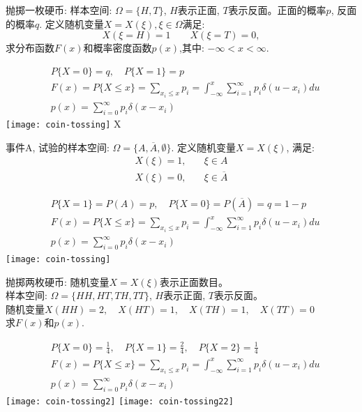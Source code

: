 \begin{frame}[shrink]
\begin{example}
抛掷一枚硬币: 样本空间: $\Omega=\{H,T\}$, $H$表示正面, $T$表示反面。正面的概率$p$, 反面的概率$q$. 定义随机变量$X=X(\xi),\xi\in \Omega$满足:
	\[X(\xi=H)=1\qquad X(\xi=T)=0,\]
	求分布函数$F(x)$和概率密度函数$p(x)$,其中: $-\infty<x<\infty$.
\end{example}
\begin{align*}
&P\{X=0\}=q,\quad P\{X=1\}=p\\
&F(x)=P\{X\le x\}=\sum\limits_{x_i\le x}p_i=\int_{-\infty}^{x}\sum\limits_{i=1}^{\infty}p_i\delta(u-x_i)du\\
&p(x)=\sum\limits_{i=0}^{\infty}p_i\delta(x-x_i)
\end{align*}
\texttt{[image: coin-tossing]} 
X\end{frame}

\begin{frame}[shrink]
\begin{example}
事件A, 试验的样本空间: $\Omega=\{A,\overline{A},\emptyset \}$. 定义随机变量$X=X(\xi)$,
满足:
\begin{align*}
	X(\xi)=1, &\quad \xi\in A\\
	X(\xi)=0, &\quad \xi\in\overline{A}
\end{align*}
\end{example}
\begin{align*}
&P\{X=1\}=P(A)=p,\quad P\{X=0\}=P(\overline{A})=q=1-p\\
&F(x)=P\{X\le x\}=\sum\limits_{x_i\le x}p_i=\int_{-\infty}^{x}\sum\limits_{i=1}^{\infty}p_i\delta(u-x_i)du\\
&p(x)=\sum\limits_{i=0}^{\infty}p_i\delta(x-x_i)
\end{align*}
\texttt{[image: coin-tossing]}
\end{frame}

\begin{frame}[shrink]
\begin{example}
抛掷两枚硬币: 随机变量$X=X(\xi)$表示正面数目。\\
样本空间: $\Omega=\{HH,HT,TH,TT\}$, $H$表示正面, $T$表示反面。\\
随机变量$X(HH)=2,\quad X(HT)=1, \quad X(TH)=1, \quad X(TT)=0$ \\
求$F(x)$和$p(x)$.
\end{example}
\begin{align*}
&P\{X=0\}=\frac{1}{4}, \quad P\{X=1\}=\frac{2}{4},\quad P\{X=2\}=\frac{1}{4}\\
&F(x)=P\{X\le x\}=\sum\limits_{x_i\le x}p_i=\int_{-\infty}^{x}\sum\limits_{i=1}^{\infty}p_i\delta(u-x_i)du\\
&p(x)=\sum\limits_{i=0}^{\infty}p_i\delta(x-x_i)
\end{align*}
\texttt{[image: coin-tossing2]} \medspace \medspace
\texttt{[image: coin-tossing22]}
\end{frame}

